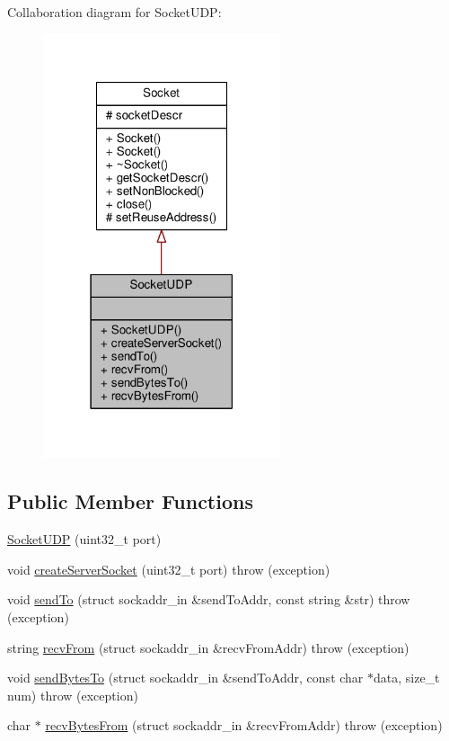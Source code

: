 Collaboration diagram for Socket\-U\-D\-P\-:
\nopagebreak
\begin{figure}[H]
\begin{center}
\leavevmode
\includegraphics[width=198pt]{class_socket_u_d_p__coll__graph}
\end{center}
\end{figure}
\subsection*{Public Member Functions}
\begin{DoxyCompactItemize}
\item 
\hyperlink{class_socket_u_d_p_aa41096c8eecdf55a7557549e8f6a5d4a}{Socket\-U\-D\-P} (uint32\-\_\-t port)
\item 
void \hyperlink{class_socket_u_d_p_a48b2c650565eba38d9654ac16d21c60c}{create\-Server\-Socket} (uint32\-\_\-t port)  throw (exception)
\item 
void \hyperlink{class_socket_u_d_p_a207c3d7c2b854b140dcb4ca9a9c81292}{send\-To} (struct sockaddr\-\_\-in \&send\-To\-Addr, const string \&str)  throw (exception)
\item 
string \hyperlink{class_socket_u_d_p_ad5a3b81f16a9db0db80a92f69c811fe1}{recv\-From} (struct sockaddr\-\_\-in \&recv\-From\-Addr)  throw (exception)
\item 
void \hyperlink{class_socket_u_d_p_a69cce05867435fb471a50319855e34fc}{send\-Bytes\-To} (struct sockaddr\-\_\-in \&send\-To\-Addr, const char $\ast$data, size\-\_\-t num)  throw (exception)
\item 
char $\ast$ \hyperlink{class_socket_u_d_p_a4c3ff487d034850ad2096339cfa06707}{recv\-Bytes\-From} (struct sockaddr\-\_\-in \&recv\-From\-Addr)  throw (exception)
\end{DoxyCompactItemize}


